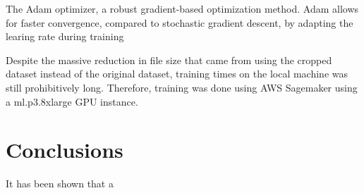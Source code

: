 \documentclass{article}
\begin{document}
The Adam optimizer, a robust gradient-based optimization method. Adam allows for faster convergence, compared to stochastic gradient descent, by adapting the learing rate during training \cite{kingma2017adam}



Despite the massive reduction in file size that came from using the cropped dataset instead of the original dataset, training times on the local machine was still prohibitively long. Therefore, training was done using AWS Sagemaker using a ml.p3.8xlarge GPU instance.


\section{Conclusions}

It has been shown that a 



\end{document}
